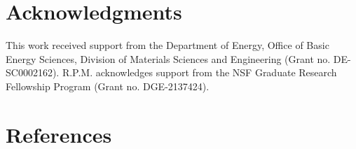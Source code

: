 \documentclass[aip, jcp, reprint, twocolumn]{revtex4-2}
\begin{document}
\section{Acknowledgments}
This work received support from the Department of Energy, Office of Basic Energy Sciences, Division of Materials Sciences and Engineering (Grant no. DE-SC0002162).
R.P.M. acknowledges support from the NSF Graduate Research Fellowship Program (Grant no. DGE-2137424). 


\section{References}

\end{document}
